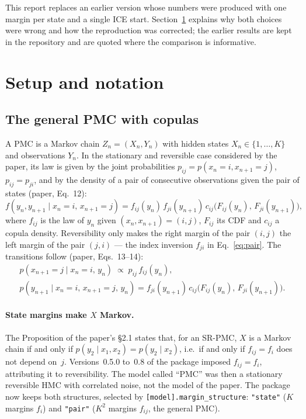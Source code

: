 \documentclass[11pt,a4paper]{article}
\begin{document}
This report replaces an earlier version whose numbers were produced with one
margin per state and a single ICE start. Section~\ref{sec:setup} explains
why both choices were wrong and how the reproduction was corrected; the
earlier results are kept in the repository and are quoted where the
comparison is informative.

\section{Setup and notation}\label{sec:setup}

\subsection{The general PMC with copulas}\label{sec:model}

A PMC is a Markov chain $Z_n=(X_n,Y_n)$ with hidden states $X_n\in\{1,\dots,K\}$
and observations $Y_n$. In the stationary and reversible case considered by
the paper, its law is given by the joint probabilities $p_{ij}=p(x_n=i,
x_{n+1}=j)$, $p_{ij}=p_{ji}$, and by the density of a pair of consecutive
observations given the pair of states (paper, Eq.~12):
\begin{equation}\label{eq:pair}
  f(y_n,y_{n+1}\mid x_n=i,\,x_{n+1}=j)
   = f_{ij}(y_n)\,f_{ji}(y_{n+1})\,
     c_{ij}\bigl(F_{ij}(y_n),\,F_{ji}(y_{n+1})\bigr),
\end{equation}
where $f_{ij}$ is the law of $y_n$ given $(x_n,x_{n+1})=(i,j)$, $F_{ij}$ its
CDF and $c_{ij}$ a copula density. Reversibility only makes the right margin
of the pair $(i,j)$ the left margin of the pair $(j,i)$ --- the index
inversion $f_{ji}$ in Eq.~\eqref{eq:pair}. The transitions follow
(paper, Eqs.~13--14):
\begin{gather}
  p(x_{n+1}=j\mid x_n=i,\,y_n)\;\propto\;p_{ij}\,f_{ij}(y_n),\\
  p(y_{n+1}\mid x_n=i,\,x_{n+1}=j,\,y_n)=f_{ji}(y_{n+1})\,c_{ij}\bigl(F_{ij}(y_n),\,F_{ji}(y_{n+1})\bigr).
\end{gather}

\paragraph{State margins make $X$ Markov.} The Proposition of the paper's
§2.1 states that, for an SR-PMC, $X$ is a Markov chain if and only if
$p(y_2\mid x_1,x_2)=p(y_2\mid x_2)$, i.e.\ if and only if $f_{ij}=f_i$ does not
depend on~$j$. Versions~0.5.0 to~0.8 of the package imposed $f_{ij}=f_i$,
attributing it to reversibility. The model called ``PMC'' was then a
stationary reversible HMC with correlated noise, not the model of the paper.
The package now keeps both structures, selected by
\texttt{[model].margin\_structure}: \texttt{"state"} ($K$ margins $f_i$) and
\texttt{"pair"} ($K^2$ margins $f_{ij}$, the general PMC).
\end{document}
